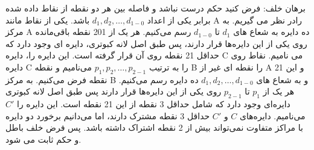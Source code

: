 \p	
برهان خلف:	فرض کنید حکم درست نباشد و فاصله بین هر دو نقطه از نقاط داده شده برابر یکی از اعداد
$d_1, d_2, \ldots ,d_{1-0}$
باشد. یکی از نقاط مانند A رادر نظر می گیریم.
به مرکز A ده دایره به شعاع های
$d_1$
تا
$d_{1-0}$
رسم می‌کنیم.
هر یک از 201 نقطه باقی‌مانده روی یکی از این دایره‌ها قرار دارند، پس طبق اصل لانه کبوتری، دایره ای وجود دارد که حداقل 21 نقطه روی آن قرار گرفته است.
این دایره را، دایره C می نامیم.
نقاط روی دایره C را به ترتیب
$p_1, p_2, \ldots ,p_{2-1}$
می‌نامیم و نقطه B را نقطه ای غیر از A و این 21 نقطه فرض می‌کنیم.
به مرکز B و به شعاع های
$d_1, d_2, \ldots ,d_{1-0}$
ده دایره رسم می‌کنیم.
هر یک از 
$p_1$
تا
$p_{2-1}$
روی یکی از این دایره‌ها قرار دارند پس طبق اصل لانه کبوتری دایره‌ای وجود دارد که شامل حداقل 3 نقطه از این 21 نقطه است. این دایره را 
$C'$
می‌نامیم.
دایره‌های 
$C$
و
$C'$
حداقل 3 نقطه مشترک دارند، اما می‌دانیم برخورد دو دایره با مراکز متفاوت نمی‌تواند بیش از 2 نقطه اشتراک داشته باشد. پس فرض خلف باطل و حکم ثابت می شود.